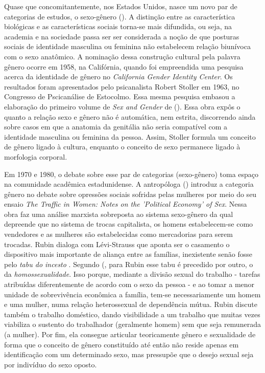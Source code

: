 Quase que concomitantemente, nos Estados Unidos, nasce um novo par de categorias de estudos, o sexo-gênero (\cite{FRAISSE2001,STOLKE2004,HARAWAY2004}). A distinção entre as característica biológicas e as características sociais torna-se mais difundida, ou seja, na academia e na sociedade passa ser ser considerada a noção de que posturas sociais de identidade masculina ou feminina não estabelecem relação biunívoca com o sexo anatômico.
A nominação dessa construção cultural pela palavra gênero ocorre em 1958, na Califórnia, quando foi empreendida uma pesquisa acerca da identidade de gênero no \emph{California Gender Identity Center}. Os resultados foram apresentados pelo psicanalista Robert Stoller em 1963, no Congresso de Pscicanálise de Estocolmo. Essa mesma pesquisa embasou a elaboração do primeiro volume de \emph{Sex and Gender} de (\citeyear{STOLLER1968}). Essa obra expôs o quanto a relação sexo e gênero não é automática, nem estrita, discorrendo ainda sobre casos em que a anatomia da genitália não seria compatível com a identidade masculina ou feminina da pessoa. Assim, Stoller formula um conceito de gênero ligado à cultura, enquanto o conceito de sexo permanece ligado à morfologia corporal.

Em 1970 e 1980, o debate sobre esse par de categorias (sexo-gênero) toma espaço na comunidade acadêmica estadunidense. A antropóloga (\citeyear{RUBIN1975})  introduz a categoria gênero no debate sobre opressões sociais sofridas pelas mulheres por meio do seu ensaio \emph{The Traffic in Women: Notes on the 'Political Economy' of Sex}. Nessa obra  faz uma análise marxista sobreposta ao sistema sexo-gênero da qual depreende que no sistema de trocas capitalista, os homens estabelecem-se como vendedores e as mulheres são estabelecidas como mercadorias para serem trocadas.
Rubin dialoga com Lévi-Strauss que aponta ser o casamento o dispositivo mais importante de aliança entre as famílias, inexistente senão fosse pelo \emph{tabu do incesto} \cite{STRAUSS2010}. Segundo (\citeyear{PISCITELLI2009}, para Rubin esse tabu é precedido por outro, o da \emph{homossexualidade}. Isso porque, mediante a divisão sexual do trabalho - tarefas atribuídas diferentemente de acordo com o sexo da pessoa - e ao tomar a menor unidade de sobrevivência econômica a família, tem-se necessariamente um homem e uma mulher, numa relação heterossexual de dependência mútua. Rubin discute também o trabalho doméstico, dando visibilidade a um trabalho que muitas vezes viabiliza o sustento do trabalhador (geralmente homem) sem que seja remunerada (a mulher). Por fim, ela consegue articular teoricamente gênero e sexualidade de forma que o conceito de gênero constituído até então não reside apenas em identificação com um determinado sexo, mas pressupõe que o desejo sexual seja por indivíduo do sexo oposto. 


